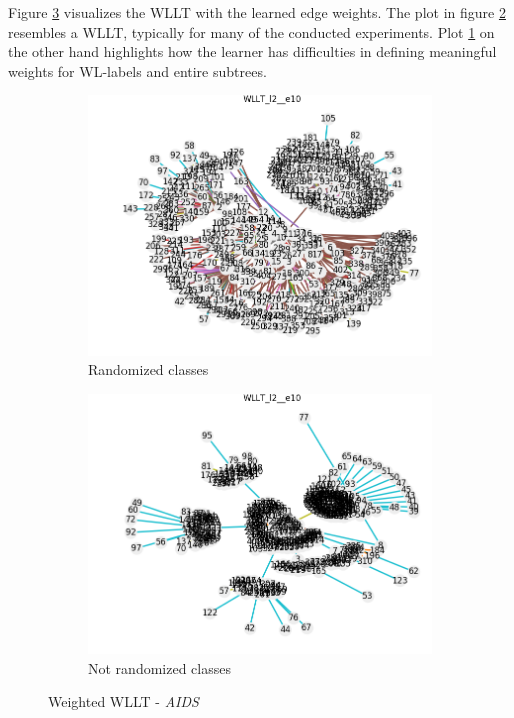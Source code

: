 		Figure \ref{fig:WeightedWLLT} visualizes the WLLT with the learned edge weights.
		The plot in figure \ref{fig:plote4wlltl2e10gdl0917h-17mexp4} resembles a WLLT, typically for many of the conducted experiments.
		Plot \ref{fig:plote4wlltl2e10gdl0916h-32mexp4} on the other hand highlights how the learner has difficulties in defining meaningful weights for WL-labels and entire subtrees.
		
		\begin{figure}[H]
			\centering
			\begin{subfigure}{0.49\textwidth}
				\centering
				\includegraphics[width=1.1\linewidth]{images/plotE4_wllt_l2_e10_GDL_09_16h-32mExp4}
				\caption{Randomized classes}
				\label{fig:plote4wlltl2e10gdl0916h-32mexp4}
			\end{subfigure}
			\begin{subfigure}{0.49\textwidth}
				\centering
				\includegraphics[width=1.1\linewidth]{images/plotE4_wllt_l2_e10_GDL_09_17h-17mExp4}
				\caption{Not randomized classes}
				\label{fig:plote4wlltl2e10gdl0917h-17mexp4}
			\end{subfigure}
			\caption{Weighted WLLT - \textit{AIDS}}
			\label{fig:WeightedWLLT}
		\end{figure}
	
